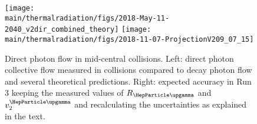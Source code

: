 
\begin{figure}[htb]
\centering
\texttt{[image: \\main/thermalradiation/figs/2018-May-11-2040\_v2dir\_combined\_theory]}
\texttt{[image: \\main/thermalradiation/figs/2018-11-07-ProjectionV209\_07\_15]}
\caption{Direct photon flow in mid-central collisions. Left: direct photon collective flow measured in \PbPb{} collisions compared to decay photon flow and several theoretical predictions. Right: expected accuracy in Run 3 keeping the  measured values of $R_{\PGg}$ and $v_{2}^{\PGg}$ and recalculating the uncertainties as explained in the text. }
\label{fig:RealPhotonsV2dir}
\end{figure}

